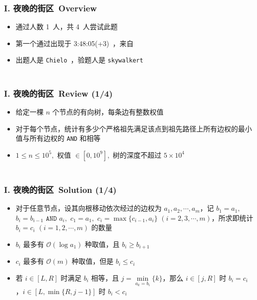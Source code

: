 \documentclass[notheorems]{beamer}
\newcommand{\zhProbI}{夜晚的街区}		\newcommand{\DiffI}{Hard}		\newcommand{\AuthProbI}{\texttt{Chielo}}		\newcommand{\TestProbI}{\texttt{skywalkert}}
\newcommand{\AccInProbI}{1}	\newcommand{\SubInProbI}{4}	\newcommand{\RatInProbI}{25.00\%}
\newcommand{\FirPenInProbI}{3:48:05(+3)}	\newcommand{\FirPerInProbI}{\Someone}
\begin{document}
\begin{frame}[label = ProbI]
\frametitle{\\ I. \zhProbI\ Overview}
\begin{spacing}{2.0} \large
\begin{itemize}
\item 通过人数 \AccInProbI\ 人，共 \SubInProbI\ 人尝试此题
\item 第一个通过出现于 \FirPenInProbI\ ，来自 \FirPerInProbI\ 
\item 出题人是 \AuthProbI\ ，验题人是 \TestProbI\
\end{itemize}
\end{spacing}
\end{frame}
\begin{frame}
\frametitle{\\ I. \zhProbI\ Review (\AccInProbI/\SubInProbI)}
\begin{spacing}{2.0} \large
\begin{itemize}
\item 给定一棵 $n$ 个节点的有向树，每条边有整数权值
\item 对于每个节点，统计有多少个严格祖先满足该点到祖先路径上所有边权的最小值与所有边权的 \texttt{AND} 和相等
\item $1 \leq n \leq 10^5,$ 权值 $\in [0, 10^9],$ 树的深度不超过 $5 \times 10^4$
\end{itemize}
\end{spacing}
\end{frame}
\begin{frame}
\frametitle{\\ I. \zhProbI\ Solution (\AccInProbI/\SubInProbI)}
\begin{spacing}{1.5} \large
\begin{itemize}[<+->]
\item 对于任意节点，设其向根移动依次经过的边权为 $a_1, a_2, \cdots, a_m$，记 $b_1 = a_1,$ $b_i = b_{i - 1}\texttt{ AND }a_i,$ $c_1 = a_1,$ $c_i = \max\{c_{i - 1}, a_i\}$ $(i = 2, 3, \cdots, m)$，所求即统计 $b_i = c_i$ $(i = 1, 2, \cdots, m)$ 的数量
\item $b_i$ 最多有 $\mathcal{O}(\log a_1)$ 种取值，且 $b_i \geq b_{i + 1}$
\item $c_i$ 最多有 $\mathcal{O}(m)$ 种取值，但是 $b_i \leq c_i$
\item 若 $i \in [L, R]$ 时满足 $b_i$ 相等，且 $j = \min\limits_{a_k = b_i}\{k\}$，那么 $i \in [j, R]$ 时 $b_i = c_i$，$i \in [L, \min\{R, j - 1\}]$ 时 $b_i < c_i$
\end{itemize}
\end{spacing}
\end{frame}
\end{document}
